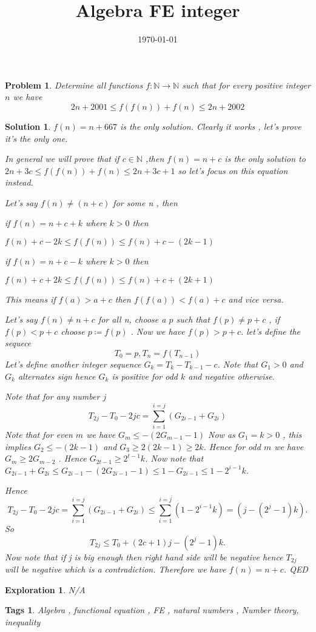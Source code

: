 \documentclass{article}
\title{Algebra FE integer }
\date{\today}
\newtheorem*{problem}{Problem}
\newtheorem*{solution}{Solution}
\newtheorem*{exploration}{Exploration}
\newtheorem*{tags}{Tags}
\begin{document}
	
	\maketitle
	
	\begin{problem}
		Determine all functions $f: \mathbb{N} \to \mathbb{N}$ such that for every positive integer $n$ we have 
		\[
		2n+2001 \leq f(f(n)) + f(n) \leq 2n+2002
		\]
	\end{problem}
	
	\begin{solution}
		$f(n)=n+667$ is the only solution. Clearly it works , let's prove it's the only one.
		
		In general we will prove that if $c \in \mathbb{N} $ ,then $f(n)=n+c$ is the only solution to 
		$2n+3c \leq f(f(n)) + f(n) \leq 2n+3c+1$ so let's focus on this equation instead.
		
		Let's say $ f(n) \neq (n+c)$ for some n , then 
		
		if $f(n)=n+c+k$ where $k>0$ then
		
		$  f(n)+c -2k \leq f(f(n)) \leq f(n) + c - (2k-1)  $
		
		if $f(n)=n+c-k$ where $k>0$ then
		
		$f(n)+c +2k \leq f(f(n)) \leq f(n) + c  + (2k+1) \label {2}$
		
		This means if $f(a)>a+c$ then $f(f(a))<f(a)+c$ and vice versa. 
		
		Let's say $f(n) \neq n+c$ for all n, choose a $p$ such that $f(p) \neq p+c$ , if $f(p) < p+c $ choose $p \coloneq f(p)$ . Now we have $f(p) > p+c $.
		let's define the sequece 
		\[
		T_{0}=p , T_{n}= f(T_{n-1})
		\]
		Let's define another integer sequence $G_{k} = T_{k} - T_{k-1} -c$. Note that $G_{1} >0 $ and $G_{k}$ alternates sign hence $G_{k}$ is positive for odd $k$ and negative otherwise.
		
		Note that for any number $j$
		\[
		T_{2j}-T_{0} - 2jc = \sum_{i=1}^{i=j} (G_{2i-1} + G_{2i})
		\]
		Note that for even $m$ we have $G_{m} \leq - (2G_{m-1}-1)$
	Now as $G_{1}=k>0$ , this implies $G_{2} \leq -(2k-1)$	and $G_{3} \geq 2(2k-1) \geq 2k $.
	Hence for odd $m$ we have $G_{m} \geq 2G_{m-2}$	. Hence $G_{2t-1} \geq 2^{t-1} k $.
	Now note that $G_{2i-1} + G_{2i} \leq G_{2i-1} -(2G_{2i-1} -1) \leq 1-G_{2i-1} \leq 1- 2^{i-1}k$.
	
	Hence 
	\[
	T_{2j}-T_{0} - 2jc = \sum_{i=1}^{i=j} (G_{2i-1} + G_{2i}) \leq \sum_{i=1}^{i=j} (1-2^{i-1} k) = (j-(2^{j}-1)k).
	\]
	So
	\[
	T_{2j}\leq  T_{0} + (2c+1)j  -(2^{j}-1)k.
	\]
	Now note that if j is big enough then right hand side will be negative hence $T_{2j}$ will be negative which is a contradiction. Therefore we have $f(n)=n+c$. QED
	
	\end{solution}
	
	\begin{exploration}
		N/A
	\end{exploration}
	
	\begin{tags}
		Algebra ,  functional equation , FE , natural numbers , Number theory, inequality
	\end{tags}
	
\end{document}
